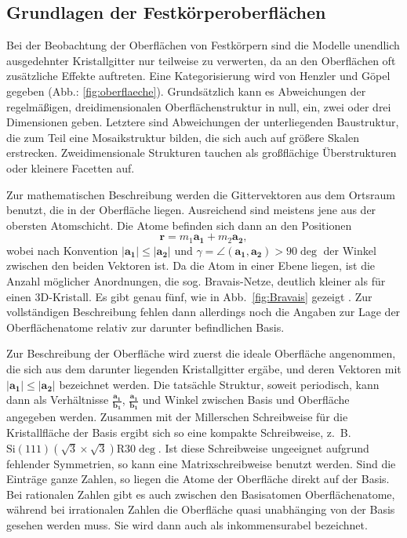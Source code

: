 \subsection{Grundlagen der Festkörperoberflächen}
Bei der Beobachtung der Oberflächen von Festkörpern sind die Modelle unendlich 
ausgedehnter Kristallgitter nur teilweise zu verwerten, da an den Oberflächen 
oft zusätzliche Effekte auftreten. Eine Kategorisierung wird von Henzler und 
Göpel \cite{henzler1991oberflachenphysik} gegeben (Abb.: \ref{fig:oberflaeche}).
Grundsätzlich kann es Abweichungen der regelmäßigen, dreidimensionalen 
Oberflächenstruktur in null, ein, zwei oder drei Dimensionen geben. Letztere 
sind Abweichungen der unterliegenden Baustruktur, die zum Teil eine Mosaikstruktur 
bilden, die sich auch auf größere Skalen erstrecken. Zweidimensionale Strukturen 
tauchen als großflächige Überstrukturen oder kleinere Facetten auf. 

Zur mathematischen Beschreibung werden die Gittervektoren aus dem Ortsraum benutzt, 
die in der Oberfläche liegen. Ausreichend sind meistens jene aus der obersten 
Atomschicht. Die Atome befinden sich dann an den Positionen 
\begin{equation}
    \mathbf{r} = m_1 \mathbf{a_1} + m_2 \mathbf{a_2},
\end{equation}
wobei nach Konvention $|\mathbf{a_1}| \le |\mathbf{a_2}|$ und 
$\gamma = \angle (\mathbf{a_1}, \mathbf{a_2}) > 90 \deg$ der Winkel zwischen den 
beiden Vektoren ist. Da die Atom in einer Ebene liegen, ist die Anzahl möglicher 
Anordnungen, die sog. Bravais-Netze, deutlich kleiner als für einen 3D-Kristall. 
Es gibt genau fünf, wie in Abb.~\ref{fig:Bravais} gezeigt 
\cite{henzler1991oberflachenphysik}.
Zur vollständigen Beschreibung fehlen dann allerdings noch die Angaben zur Lage 
der Oberflächenatome relativ zur darunter befindlichen Basis. 

Zur Beschreibung der Oberfläche wird zuerst die ideale Oberfläche angenommen, 
die sich aus dem darunter liegenden Kristallgitter ergäbe, und deren Vektoren mit
$|\mathbf{a_1}| \le |\mathbf{a_2}|$ bezeichnet werden. Die tatsächle Struktur, 
soweit periodisch, kann dann als Verhältnisse $\frac{\mathbf{a_1}}{\mathbf{b_1}}$, 
$\frac{\mathbf{a_1}}{\mathbf{b_1}}$ und Winkel zwischen Basis und Oberfläche angegeben 
werden. Zusammen mit der Millerschen Schreibweise für die Kristallfläche der Basis 
ergibt sich so eine kompakte Schreibweise, z.~B. 
$\mathrm{Si}(111)(\sqrt{3} \times \sqrt{3}) \mathrm{R} 30 \deg$. 
Ist diese Schreibweise ungeeignet aufgrund fehlender Symmetrien, so kann eine 
Matrixschreibweise benutzt werden. Sind die Einträge ganze Zahlen, so liegen die 
Atome der Oberfläche direkt auf der Basis. Bei rationalen Zahlen gibt es auch 
zwischen den Basisatomen Oberflächenatome, während bei irrationalen Zahlen die 
Oberfläche quasi unabhänging von der Basis gesehen werden muss. Sie wird dann auch 
als inkommensurabel bezeichnet. \cite{henzler1991oberflachenphysik}


